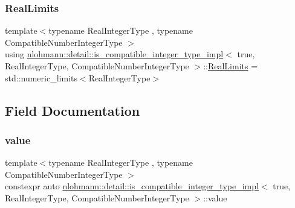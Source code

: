 \subsubsection{\texorpdfstring{RealLimits}{RealLimits}}
{\footnotesize\ttfamily template$<$typename Real\+Integer\+Type , typename Compatible\+Number\+Integer\+Type $>$ \\
using \mbox{\hyperlink{structnlohmann_1_1detail_1_1is__compatible__integer__type__impl}{nlohmann\+::detail\+::is\+\_\+compatible\+\_\+integer\+\_\+type\+\_\+impl}}$<$ true, Real\+Integer\+Type, Compatible\+Number\+Integer\+Type $>$\+::\mbox{\hyperlink{structnlohmann_1_1detail_1_1is__compatible__integer__type__impl_3_01true_00_01_real_integer_type78b0ba77f36a8c8169cdb79b01d1a4bf_a1bad172320cd124997a3d68990f50a75}{Real\+Limits}} =  std\+::numeric\+\_\+limits$<$Real\+Integer\+Type$>$}



\subsection{Field Documentation}
\mbox{\label{structnlohmann_1_1detail_1_1is__compatible__integer__type__impl_3_01true_00_01_real_integer_type78b0ba77f36a8c8169cdb79b01d1a4bf_a4c27142452b43418b1d5c0aad01bff50}} 
\subsubsection{\texorpdfstring{value}{value}}
{\footnotesize\ttfamily template$<$typename Real\+Integer\+Type , typename Compatible\+Number\+Integer\+Type $>$ \\
constexpr auto \mbox{\hyperlink{structnlohmann_1_1detail_1_1is__compatible__integer__type__impl}{nlohmann\+::detail\+::is\+\_\+compatible\+\_\+integer\+\_\+type\+\_\+impl}}$<$ true, Real\+Integer\+Type, Compatible\+Number\+Integer\+Type $>$\+::value\hspace{0.3cm}{\ttfamily [static]}}

